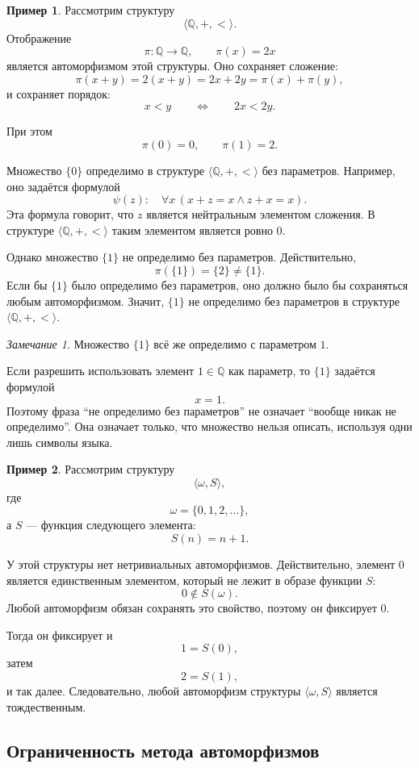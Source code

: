 \documentclass[12pt,a4paper,oneside,openany]{book}
\theoremstyle{definition}
\newtheorem{example}{Пример}[chapter]
\theoremstyle{plain}
\theoremstyle{remark}
\newtheorem{remark}{Замечание}[chapter]
\begin{document}
\begin{example}
Рассмотрим структуру
\[
\langle\mathbb Q,+,<\rangle.
\]
Отображение
\[
\pi:\mathbb Q\to\mathbb Q,
\qquad
\pi(x)=2x
\]
является автоморфизмом этой структуры. Оно сохраняет сложение:
\[
\pi(x+y)=2(x+y)=2x+2y=\pi(x)+\pi(y),
\]
и сохраняет порядок:
\[
x<y
\qquad
\Longleftrightarrow
\qquad
2x<2y.
\]

При этом
\[
\pi(0)=0,
\qquad
\pi(1)=2.
\]

Множество $\{0\}$ определимо в структуре $\langle\mathbb Q,+,<\rangle$ без параметров. Например, оно задаётся формулой
\[
\psi(z):\quad \forall x\,(x+z=x\wedge z+x=x).
\]
Эта формула говорит, что $z$ является нейтральным элементом сложения. В структуре $\langle\mathbb Q,+,<\rangle$ таким элементом является ровно $0$.

Однако множество $\{1\}$ не определимо без параметров. Действительно,
\[
\pi(\{1\})=\{2\}\ne\{1\}.
\]
Если бы $\{1\}$ было определимо без параметров, оно должно было бы сохраняться любым автоморфизмом. Значит, $\{1\}$ не определимо без параметров в структуре $\langle\mathbb Q,+,<\rangle$.
\end{example}

\begin{remark}
Множество $\{1\}$ всё же определимо с параметром $1$.

Если разрешить использовать элемент $1\in\mathbb Q$ как параметр, то $\{1\}$ задаётся формулой
\[
x=1.
\]
Поэтому фраза ``не определимо без параметров'' не означает ``вообще никак не определимо''. Она означает только, что множество нельзя описать, используя одни лишь символы языка.
\end{remark}

\begin{example}
Рассмотрим структуру
\[
\langle\omega,S\rangle,
\]
где
\[
\omega=\{0,1,2,\ldots\},
\]
а $S$ — функция следующего элемента:
\[
S(n)=n+1.
\]

У этой структуры нет нетривиальных автоморфизмов. Действительно, элемент $0$ является единственным элементом, который не лежит в образе функции $S$:
\[
0\notin S(\omega).
\]
Любой автоморфизм обязан сохранять это свойство, поэтому он фиксирует $0$.

Тогда он фиксирует и
\[
1=S(0),
\]
затем
\[
2=S(1),
\]
и так далее. Следовательно, любой автоморфизм структуры $\langle\omega,S\rangle$ является тождественным.
\end{example}

\subsection{Ограниченность метода автоморфизмов}
\end{document}
